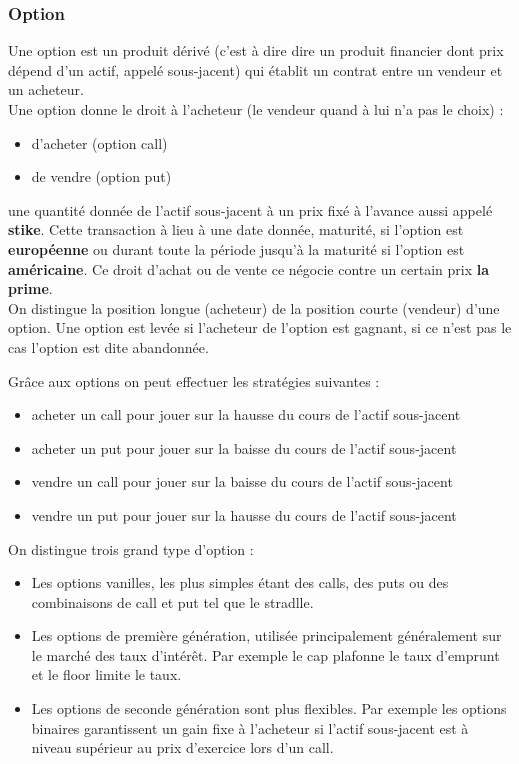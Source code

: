 \subsubsection{Option}
Une option est un produit dérivé (c'est à dire dire un produit financier dont prix dépend d'un actif, appelé sous-jacent) qui établit un contrat entre un vendeur et un acheteur. \\

Une option donne le droit à l'acheteur (le vendeur quand à lui n'a pas le choix) :
\begin{itemize}
\item d'acheter (option call)
\item de vendre (option put) 
\end{itemize}

une quantité donnée de l'actif sous-jacent à un prix fixé à l'avance aussi appelé \textbf{stike}. Cette transaction à lieu à une date donnée, maturité, si l'option est \textbf{européenne} ou durant toute la période jusqu'à la maturité si l'option est \textbf{américaine}. Ce droit d'achat ou de vente ce négocie contre un certain prix \textbf{la prime}. \\

On distingue la position longue (acheteur) de la position courte (vendeur) d'une option. Une option est levée si l'acheteur de l'option est gagnant, si ce n'est pas le cas l'option est dite abandonnée.

Grâce aux options on peut effectuer les stratégies suivantes : 
\begin{itemize}
\item acheter un call pour jouer sur la hausse du cours de l'actif sous-jacent
\item acheter un put pour jouer sur la baisse du cours de l'actif sous-jacent
\item vendre un call pour jouer sur la baisse du cours de l'actif sous-jacent
\item vendre un put pour jouer sur la hausse du cours de l'actif sous-jacent
\end{itemize}

On distingue trois grand type d'option :
\begin{itemize}
\item Les options vanilles, les plus simples étant des calls, des puts ou des combinaisons de call et put tel que le stradlle.
\item Les options de première génération, utilisée principalement généralement sur le marché des taux d'intérêt. Par exemple le cap plafonne le taux d'emprunt et le floor limite le taux. 
\item Les options de seconde génération sont plus flexibles. Par exemple les options binaires garantissent un gain fixe à l'acheteur si l'actif sous-jacent est à niveau supérieur au prix d'exercice lors d'un call. 
\end{itemize}

